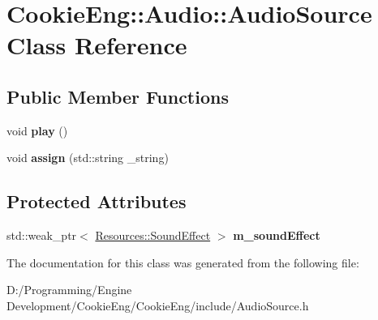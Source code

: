 \hypertarget{class_cookie_eng_1_1_audio_1_1_audio_source}{}\section{Cookie\+Eng\+:\+:Audio\+:\+:Audio\+Source Class Reference}
\label{class_cookie_eng_1_1_audio_1_1_audio_source}
\subsection*{Public Member Functions}
\begin{DoxyCompactItemize}
\item 
\mbox{\label{class_cookie_eng_1_1_audio_1_1_audio_source_a077bce5d4bc73b97f261e830558c5350}} 
void {\bfseries play} ()
\item 
\mbox{\label{class_cookie_eng_1_1_audio_1_1_audio_source_a36d0e1b2c5702eeb1fc63236ad19e6d4}} 
void {\bfseries assign} (std\+::string \+\_\+string)
\end{DoxyCompactItemize}
\subsection*{Protected Attributes}
\begin{DoxyCompactItemize}
\item 
\mbox{\label{class_cookie_eng_1_1_audio_1_1_audio_source_af883ecb61be31c5e85f3666934080f4e}} 
std\+::weak\+\_\+ptr$<$ \hyperlink{class_cookie_eng_1_1_resources_1_1_sound_effect}{Resources\+::\+Sound\+Effect} $>$ {\bfseries m\+\_\+sound\+Effect}
\end{DoxyCompactItemize}


The documentation for this class was generated from the following file\+:\begin{DoxyCompactItemize}
\item 
D\+:/\+Programming/\+Engine Development/\+Cookie\+Eng/\+Cookie\+Eng/include/Audio\+Source.\+h\end{DoxyCompactItemize}
